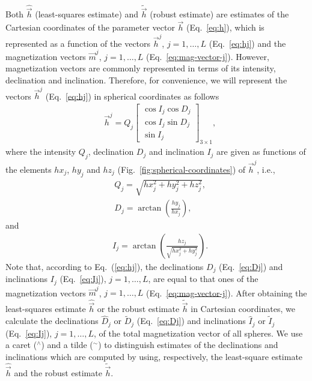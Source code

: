 \documentclass[journal abbreviation, npg]{copernicus}
\begin{document}
Both $\hat{\vec{h}}$ (least-squares estimate) and $\tilde{\vec{h}}$ (robust
estimate) are estimates of the Cartesian coordinates of the parameter vector 
$\vec{h}$ (Eq.~\ref{eq:h}),
which is represented as a function of the vectors $\vec{h}^{j}$, $j = 1,
\ldots, L$ (Eq.~\ref{eq:hj}) and the magnetization vectors $\vec{m}^{j}$, $j
= 1, \ldots, L$ (Eq.~\ref{eq:mag-vector-j}). However, magnetization vectors
are commonly represented
in terms of its intensity, declination and inclination. Therefore, for
convenience, we will represent the vectors $\vec{h}^{j}$ (Eq.~\ref{eq:hj}) in
spherical coordinates as follows
\begin{align}
 &
\vec{h}^{j} = Q_{j}
\begin{bmatrix}
\cos I_{j}  \cos D_{j} \\
\cos I_{j}  \sin D_{j} \\
\sin I_{j}
\end{bmatrix}
_{3 \times 1} ,
\label{eq:hj-spheric}
\end{align}
where the intensity $Q_{j}$, declination $D_{j}$ and inclination
$I_{j}$ are given as functions of the elements $hx_{j}$, $hy_{j}$ and
$hz_{j}$ (Fig.~\ref{fig:spherical-coordinates}) of $\vec{h}^{j}$,
i.e.,
\begin{align}
 &
Q_{j} = \sqrt{hx_{j}^{2} + hy_{j}^{2} + hz_{j}^{2}},
\label{eq:Qj}
\\
&
D_{j} = \arctan \left(\frac{hy_{j}}{hx_{j}} \right),
\label{eq:Dj}
\end{align}
and
\begin{align}
 &
I_{j} = \arctan \left(\frac{hz_{j}}{\sqrt{hx_{j}^{2} + hy_{j}^{2}}} \right).
\label{eq:Ij}
\end{align}
Note that, according to Eq.~(\ref{eq:hj}), the declinations $D_{j}$
(Eq.~\ref{eq:Dj}) and inclinations $I_{j}$ (Eq.~\ref{eq:Ij}), $j = 1, \ldots,
L$, are equal to that ones of the magnetization vectors $\vec{m}^{j}$, $j =
1, \ldots, L$ (Eq.~\ref{eq:mag-vector-j}). After obtaining the least-squares
estimate $\hat{\vec{h}}$ or the robust estimate $\tilde{\vec{h}}$ in Cartesian
coordinates, we
calculate the declinations $\hat{D}_{j}$ or $\tilde{D}_{j}$ (Eq.~\ref{eq:Dj})
and inclinations $\hat{I}_{j}$ or $\tilde{I}_{j}$ (Eq.~\ref{eq:Ij}), $j = 1,
\ldots, L$, of the total magnetization vector of all spheres. We use a caret
($^\wedge$) and a tilde ($^\sim$) to distinguish estimates of the
declinations and inclinations which are computed by using, respectively, the
least-square estimate $\hat{\vec{h}}$ and the robust estimate
$\tilde{\vec{h}}$.
\end{document}
